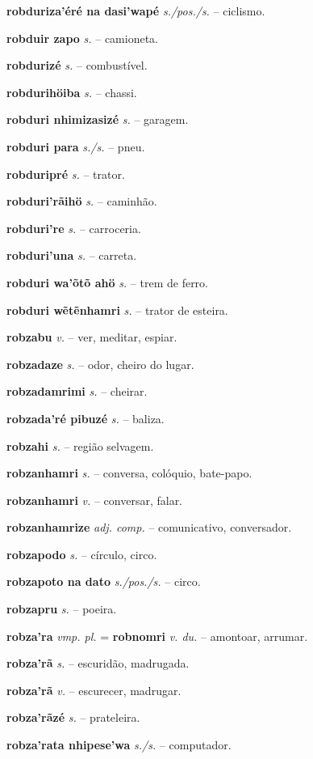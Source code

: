 \textbf{robduriza'éré na dasi'wapé} \textit{s./pos./s.} -- ciclismo.

\textbf{robduir zapo} \textit{s.} -- camioneta.

\textbf{robdurizé} \textit{s.} -- combustível.

\textbf{robdurihöiba} \textit{s.} -- chassi.

\textbf{robduri nhimizasizé} \textit{s.} -- garagem.

\textbf{robduri para} \textit{s./s.} -- pneu.

\textbf{robduripré} \textit{s.} -- trator.

\textbf{robduri'rãihö} \textit{s.} -- caminhão.

\textbf{robduri're} \textit{s.} -- carroceria.

\textbf{robduri'una} \textit{s.} -- carreta.

\textbf{robduri wa'õtõ ahö} \textit{s.} -- trem de ferro.

\textbf{robduri wẽtẽnhamri} \textit{s.} -- trator de esteira.

\textbf{robzabu} \textit{v.} -- ver, meditar, espiar.

\textbf{robzadaze} \textit{s.} -- odor, cheiro do lugar.

\textbf{robzadamrimi} \textit{s.} -- cheirar.

\textbf{robzada'ré pibuzé} \textit{s.} -- baliza.

\textbf{robzahi} \textit{s.} -- região selvagem.

\textbf{robzanhamri} \textit{s.} -- conversa, colóquio, bate-papo.

\textbf{robzanhamri} \textit{v.} -- conversar, falar.

\textbf{robzanhamrize} \textit{adj. comp.} -- comunicativo, conversador.

\textbf{robzapodo} \textit{s.} -- círculo, circo.

\textbf{robzapoto na dato} \textit{s./pos./s.} -- circo.

\textbf{robzapru} \textit{s.} -- poeira.

\textbf{robza'ra} \textit{vmp. pl.} = \textbf{robnomri} \textit{v. du.} -- amontoar, arrumar.

\textbf{robza'rã} \textit{s.} -- escuridão, madrugada.

\textbf{robza'rã} \textit{v.} -- escurecer, madrugar.

\textbf{robza'rãzé} \textit{s.} -- prateleira.

\textbf{robza'rata nhipese'wa} \textit{s./s.} -- computador.

